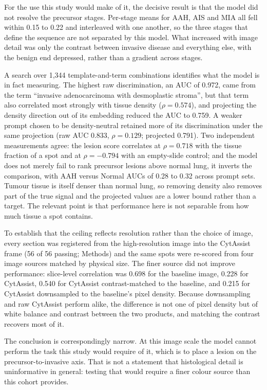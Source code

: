 For the use this study would make of it, the decisive result is that the model did not
resolve the precursor stages. Per-stage means for AAH, AIS and MIA all fell within 0.15 to
0.22 and interleaved with one another, so the three stages that define the sequence are not
separated by this model. What increased with image detail was only the contrast between
invasive disease and everything else, with the benign end depressed, rather than a gradient
across stages.

A search over 1,344 template-and-term combinations identifies what the model is in fact
measuring. The highest raw discrimination, an AUC of 0.972, came from the term
``invasive adenocarcinoma with desmoplastic stroma'', but that term also correlated most
strongly with tissue density ($\rho=0.574$), and projecting the density direction out of its
embedding reduced the AUC to 0.759. A weaker prompt chosen to be density-neutral retained
more of its discrimination under the same projection (raw AUC 0.833, $\rho=0.129$;
projected 0.791). Two independent measurements agree: the lesion score correlates at
$\rho=0.718$ with the tissue fraction of a spot and at $\rho=-0.794$ with an empty-slide
control; and the model does not merely fail to rank precursor lesions above normal lung, it
inverts the comparison, with AAH versus Normal AUCs of 0.28 to 0.32 across prompt sets.
Tumour tissue is itself denser than normal lung, so removing density also removes part of the
true signal and the projected values are a lower bound rather than a target. The relevant
point is that performance here is not separable from how much tissue a spot contains.

To establish that the ceiling reflects resolution rather than the choice of image, every
section was registered from the high-resolution image into the CytAssist frame (56 of 56
passing; Methods) and the same spots were re-scored from four image sources matched by
physical size. The finer source did not improve performance: slice-level correlation was
0.698 for the baseline image, 0.228 for CytAssist, 0.540 for CytAssist contrast-matched to
the baseline, and 0.215 for CytAssist downsampled to the baseline's pixel density. Because
downsampling and raw CytAssist perform alike, the difference is not one of pixel density but
of white balance and contrast between the two products, and matching the contrast recovers
most of it.

The conclusion is correspondingly narrow. At this image scale the model cannot perform the
task this study would require of it, which is to place a lesion on the precursor-to-invasive
axis. That is not a statement that histological detail is uninformative in general: testing
that would require a finer colour source than this cohort provides.

